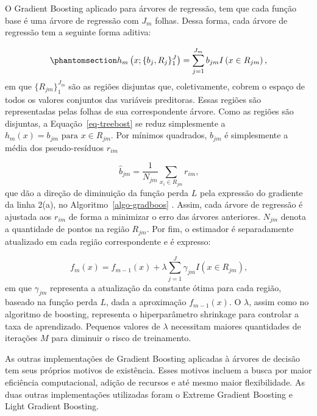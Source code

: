 \documentclass[
  12pt,
  a4paper,
]{scrreprt}
\begin{document}
\vspace{12pt}

O Gradient Boosting aplicado para árvores de regressão, tem que cada
função base é uma árvore de regressão com \(J_m\) folhas. Dessa forma,
cada árvore de regressão tem a seguinte forma aditiva:

\begin{equation}\phantomsection\label{eq-treebost}{
h_m\left(x;\{b_j, R_j\}^J_{1}\right) = \sum^{J_m}_{j = 1} b_{jm} I\left(x \in R_{jm}\right)\text{,}
}\end{equation} em que \(\{R_{jm}\}^{J_m}_{1}\) são as regiões disjuntas
que, coletivamente, cobrem o espaço de todos os valores conjuntos das
variáveis preditoras. Essas regiões são representadas pelas folhas de
sua correspondente árvore. Como as regiões são disjuntas, a
Equação~\ref{eq-treebost} se reduz simplesmente a
\(h_m\left(x\right) = b_{jm}\text{ para } x \in  R_{jm}\). Por mínimos
quadrados, \(b_{jm}\) é simplesmente a média dos pseudo-resíduos
\(r_{im}\)

\[
\hat{b}_{jm} = \frac{1}{N_{jm}} \sum_{x_i \in R_{jm}} r_{im}\text{,}
\] que dão a direção de diminuição da função perda \(L\) pela expressão
do gradiente da linha 2(a), no  Algoritmo~\ref{algo-gradboos} . Assim,
cada árvore de regressão é ajustada aos \(r_{im}\) de forma a minimizar
o erro das árvores anteriores. \(N_{jm}\) denota a quantidade de pontos
na região \(R_{jm}\). Por fim, o estimador é separadamente atualizado em
cada região correspondente e é expresso:

\[
f_m\left(x\right) = f_{m - 1}\left(x\right) + \lambda \sum^{J}_{j = 1} \gamma_{jm} I\left(x \in R_{jm}\right)\text{,}
\] em que \(\gamma_{jm}\) representa a atualização da constante ótima
para cada região, baseado na função perda \(L\), dada a aproximação
\(f_{m-1}\left(x\right)\). O \(\lambda\), assim como no algoritmo de
boosting, representa o hiperparâmetro shrinkage para controlar a taxa de
aprendizado. Pequenos valores de \(\lambda\) necessitam maiores
quantidades de iterações \(M\) para diminuir o risco de treinamento.

\vspace{12pt}

As outras implementações de Gradient Boosting aplicadas à árvores de
decisão tem seus próprios motivos de existência. Esses motivos incluem a
busca por maior eficiência computacional, adição de recursos e até mesmo
maior flexibilidade. As duas outras implementações utilizadas foram o
Extreme Gradient Boosting e Light Gradient Boosting.
\end{document}
